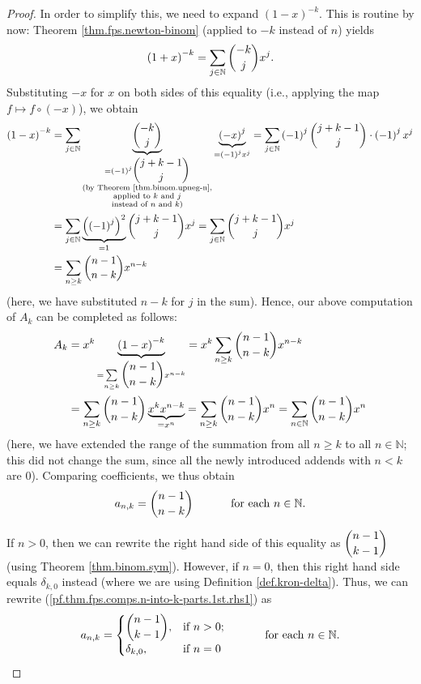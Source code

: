 \begin{proof}
In order to simplify this, we need to expand $\left(  1-x\right)  ^{-k}$. This
is routine by now: Theorem \ref{thm.fps.newton-binom} (applied to $-k$ instead
of $n$) yields%
\[
\left(  1+x\right)  ^{-k}=\sum_{j\in\mathbb{N}}\dbinom{-k}{j}x^{j}.
\]
Substituting $-x$ for $x$ on both sides of this equality (i.e., applying the
map $f\mapsto f\circ\left(  -x\right)  $), we obtain%
\begin{align}
\left(  1-x\right)  ^{-k}  &  =\sum_{j\in\mathbb{N}}\underbrace{\dbinom{-k}%
{j}}_{\substack{=\left(  -1\right)  ^{j}\dbinom{j+k-1}{j}\\\text{(by Theorem
\ref{thm.binom.upneg-n},}\\\text{applied to }k\text{ and }j\\\text{instead of
}n\text{ and }k\text{)}}}\underbrace{\left(  -x\right)  ^{j}}_{=\left(
-1\right)  ^{j}x^{j}}=\sum_{j\in\mathbb{N}}\left(  -1\right)  ^{j}%
\dbinom{j+k-1}{j}\cdot\left(  -1\right)  ^{j}x^{j}\nonumber\\
&  =\sum_{j\in\mathbb{N}}\underbrace{\left(  \left(  -1\right)  ^{j}\right)
^{2}}_{=1}\dbinom{j+k-1}{j}x^{j}=\sum_{j\in\mathbb{N}}\dbinom{j+k-1}{j}%
x^{j}\label{pf.thm.fps.comps.num-comps-n-k.1-x-k}\\
&  =\sum\limits_{n\geq k}\dbinom{n-1}{n-k}x^{n-k}\nonumber
\end{align}
(here, we have substituted $n-k$ for $j$ in the sum). Hence, our above
computation of $A_{k}$ can be completed as follows:
\begin{align*}
A_{k}  &  =x^{k}\underbrace{\left(  1-x\right)  ^{-k}}_{=\sum\limits_{n\geq
k}\dbinom{n-1}{n-k}x^{n-k}}=x^{k}\sum\limits_{n\geq k}\dbinom{n-1}{n-k}%
x^{n-k}\\
&  =\sum\limits_{n\geq k}\dbinom{n-1}{n-k}\underbrace{x^{k}x^{n-k}}_{=x^{n}%
}=\sum\limits_{n\geq k}\dbinom{n-1}{n-k}x^{n}=\sum\limits_{n\in\mathbb{N}%
}\dbinom{n-1}{n-k}x^{n}%
\end{align*}
(here, we have extended the range of the summation from all $n\geq k$ to all
$n\in\mathbb{N}$; this did not change the sum, since all the newly introduced
addends with $n<k$ are $0$). Comparing coefficients, we thus obtain%
\begin{equation}
a_{n,k}=\dbinom{n-1}{n-k}\ \ \ \ \ \ \ \ \ \ \text{for each }n\in\mathbb{N}.
\label{pf.thm.fps.comps.n-into-k-parts.1st.rhs1}%
\end{equation}


If $n>0$, then we can rewrite the right hand side of this equality as
$\dbinom{n-1}{k-1}$ (using Theorem \ref{thm.binom.sym}). However, if $n=0$,
then this right hand side equals $\delta_{k,0}$ instead (where we are using
Definition \ref{def.kron-delta}). Thus, we can rewrite
(\ref{pf.thm.fps.comps.n-into-k-parts.1st.rhs1}) as%
\begin{equation}
a_{n,k}=%
\begin{cases}
\dbinom{n-1}{k-1}, & \text{if }n>0;\\
\delta_{k,0}, & \text{if }n=0
\end{cases}
\ \ \ \ \ \ \ \ \ \ \text{for each }n\in\mathbb{N}.
\label{pf.thm.fps.comps.n-into-k-parts.1st.rhs2}%
\end{equation}


\end{proof}
